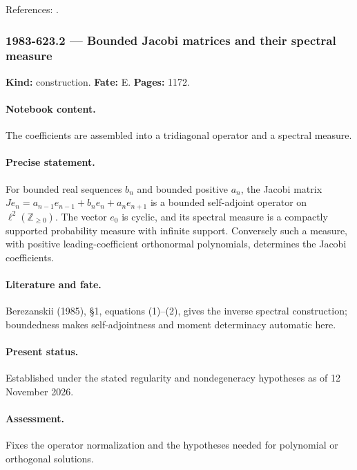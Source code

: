 \noindent References: \citep{berezanskii1985integration}.\par

\subsubsection{1983-623.2 --- Bounded Jacobi matrices and their spectral measure}

\label{item:1983-623.2}

\noindent\textbf{Kind:} construction. \textbf{Fate:} E. \textbf{Pages:} 1172.\par

\paragraph{Notebook content.} The coefficients are assembled into a tridiagonal operator and a spectral measure.

\paragraph{Precise statement.} For bounded real sequences \(b_n\) and bounded positive \(a_n\), the Jacobi matrix \(Je_n=a_{n-1}e_{n-1}+b_ne_n+a_ne_{n+1}\) is a bounded self-adjoint operator on \(\ell^2(\mathbb Z_{\ge0})\). The vector \(e_0\) is cyclic, and its spectral measure is a compactly supported probability measure with infinite support. Conversely such a measure, with positive leading-coefficient orthonormal polynomials, determines the Jacobi coefficients.

\paragraph{Literature and fate.} Berezanskii (1985), \S1, equations (1)–(2), gives the inverse spectral construction; boundedness makes self-adjointness and moment determinacy automatic here.

\paragraph{Present status.} Established under the stated regularity and nondegeneracy hypotheses as of 12 November 2026.

\paragraph{Assessment.} Fixes the operator normalization and the hypotheses needed for polynomial or orthogonal solutions.

